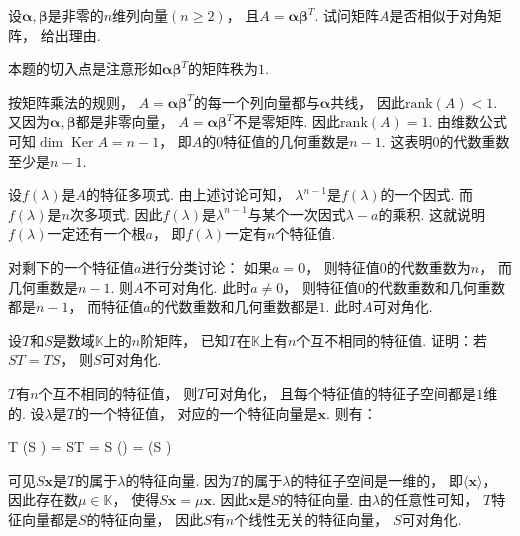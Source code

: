 \bigskip

\begin{example}
    设$\bm{\alpha},\bm{\beta}$是非零的$n$维列向量$(n \geq 2)$，
    且$A = \bm{\alpha} \bm{\beta}^T$.
    试问矩阵$A$是否相似于对角矩阵，
    给出理由.
\end{example}
\smallskip
\begin{remark}
    本题的切入点是注意形如$\bm{\alpha} \bm{\beta}^T$的矩阵秩为$1$.
\end{remark}
\smallskip
\begin{pf}
    按矩阵乘法的规则，
    $A = \bm{\alpha} \bm{\beta}^T$的每一个列向量都与$\bm{\alpha}$共线，
    因此$\mathrm{rank}(A) < 1$.
    又因为$\bm{\alpha},\bm{\beta}$都是非零向量，
    $A =  \bm{\alpha} \bm{\beta}^T$不是零矩阵.
    因此$\mathrm{rank} (A) = 1$.
    由维数公式可知$\dim \operatorname{Ker} A = n-1$，
    即$A$的$0$特征值的几何重数是$n-1$.
    这表明$0$的代数重数至少是$n-1$.

    设$f(\lambda)$是$A$的特征多项式.
    由上述讨论可知，
    $\lambda^{n-1}$是$f(\lambda)$的一个因式.
    而$f(\lambda)$是$n$次多项式.
    因此$f(\lambda)$是$\lambda^{n-1}$与某个一次因式$\lambda - a$的乘积.
    这就说明$f(\lambda)$一定还有一个根$a$，
    即$f(\lambda)$一定有$n$个特征值.

    对剩下的一个特征值$a$进行分类讨论：
    如果$a=0$，
    则特征值$0$的代数重数为$n$，
    而几何重数是$n-1$.
    则$A$不可对角化.
    此时$a \ne 0$，
    则特征值$0$的代数重数和几何重数都是$n-1$，
    而特征值$a$的代数重数和几何重数都是$1$.
    此时$A$可对角化.
\end{pf}


\bigskip

\begin{example}
    设$T$和$S$是数域$\mathbb{K}$上的$n$阶矩阵，
    已知$T$在$\mathbb{K}$上有$n$个互不相同的特征值.
    证明：若$ST = TS$，
    则$S$可对角化.
\end{example}
\smallskip
\begin{pf}
    $T$有$n$个互不相同的特征值，
    则$T$可对角化，
    且每个特征值的特征子空间都是$1$维的.
    设$\lambda$是$T$的一个特征值，
    对应的一个特征向量是$\bm{x}$.
    则有：
    \begin{eq1}
        T (S )
        = ST  
        = S (\lambda {})
        = \lambda (S )
    \end{eq1}

    可见$S\bm{x}$是$T$的属于$\lambda$的特征向量.
    因为$T$的属于$\lambda$的特征子空间是一维的，
    即$\langle \bm{x} \rangle$，
    因此存在数$\mu \in \mathbb{K}$，
    使得$S \bm{x} = \mu \bm{x}$.
    因此$\bm{x}$是$S$的特征向量.
    由$\lambda$的任意性可知，
    $T$特征向量都是$S$的特征向量，
    因此$S$有$n$个线性无关的特征向量，
    $S$可对角化.
\end{pf}

